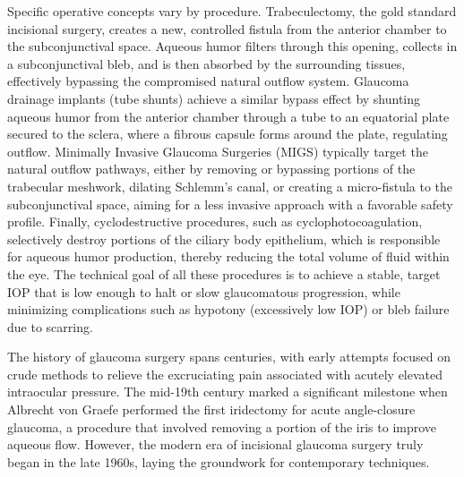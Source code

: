 Specific operative concepts vary by procedure. Trabeculectomy, the gold standard incisional surgery, creates a new, controlled fistula from the anterior chamber to the subconjunctival space. Aqueous humor filters through this opening, collects in a subconjunctival bleb, and is then absorbed by the surrounding tissues, effectively bypassing the compromised natural outflow system. Glaucoma drainage implants (tube shunts) achieve a similar bypass effect by shunting aqueous humor from the anterior chamber through a tube to an equatorial plate secured to the sclera, where a fibrous capsule forms around the plate, regulating outflow. Minimally Invasive Glaucoma Surgeries (MIGS) typically target the natural outflow pathways, either by removing or bypassing portions of the trabecular meshwork, dilating Schlemm's canal, or creating a micro-fistula to the subconjunctival space, aiming for a less invasive approach with a favorable safety profile. Finally, cyclodestructive procedures, such as cyclophotocoagulation, selectively destroy portions of the ciliary body epithelium, which is responsible for aqueous humor production, thereby reducing the total volume of fluid within the eye. The technical goal of all these procedures is to achieve a stable, target IOP that is low enough to halt or slow glaucomatous progression, while minimizing complications such as hypotony (excessively low IOP) or bleb failure due to scarring.

The history of glaucoma surgery spans centuries, with early attempts focused on crude methods to relieve the excruciating pain associated with acutely elevated intraocular pressure. The mid-19th century marked a significant milestone when Albrecht von Graefe performed the first iridectomy for acute angle-closure glaucoma, a procedure that involved removing a portion of the iris to improve aqueous flow. However, the modern era of incisional glaucoma surgery truly began in the late 1960s, laying the groundwork for contemporary techniques.

